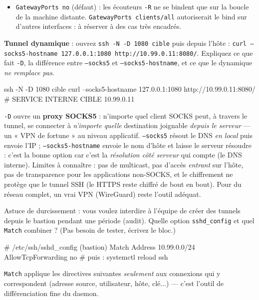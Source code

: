 \documentclass[a4paper,10pt]{exam}
\begin{document}
\begin{questions}
\begin{solution}
\begin{itemize}
{        par le client distant} (le client local \texttt{-L} est quand même possible ;
        c'est \texttt{PermitTunnel} et les règles \texttt{Match} qui affinent).
        Sur un bastion « kiosque » (accès shell only, pas de tunnel),
        \texttt{AllowTcpForwarding no} empêche d'utiliser le bastion comme relais pour
        contourner le réseau.
  \item \texttt{GatewayPorts no} (défaut) : les écouteurs \texttt{-R} ne se bindent que sur
        la boucle de la machine distante. \texttt{GatewayPorts clients/all} autoriserait
        le bind sur d'autres interfaces : à réserver à des cas très encadrés.
\end{itemize}
\end{solution}
\question \textbf{Tunnel dynamique} : ouvrez \texttt{ssh -N -D 1080 cible} puis depuis
l'hôte : \texttt{curl --socks5-hostname 127.0.0.1:1080
http://10.99.0.11:8080/}. Expliquez ce que fait \texttt{-D}, la différence entre
\texttt{--socks5} et \texttt{--socks5-hostname}, et ce que le dynamique \emph{ne remplace
pas}.
\begin{solution}
\begin{bashcode}
ssh -N -D 1080 cible
curl --socks5-hostname 127.0.0.1:1080 http://10.99.0.11:8080/
# SERVICE INTERNE CIBLE 10.99.0.11
\end{bashcode}
\texttt{-D} ouvre un \textbf{proxy SOCKS5} : n'importe quel client SOCKS peut, à travers
le tunnel, se connecter à \emph{n'importe quelle} destination joignable \emph{depuis le
serveur} — un « VPN de fortune » au niveau applicatif.
\texttt{--socks5} résout le DNS \emph{en local} puis envoie l'IP ;
\texttt{--socks5-hostname} envoie le nom d'hôte et laisse le serveur résoudre : c'est la
bonne option car c'est la \emph{résolution côté serveur} qui compte (le DNS interne).
Limites à connaître : pas de multicast, pas d'accès \emph{entrant} sur l'hôte, pas de
transparence pour les applications non-SOCKS, et le chiffrement ne protège que le tunnel
SSH (le HTTPS reste chiffré de bout en bout). Pour du réseau complet, un vrai VPN
(WireGuard) reste l'outil adéquat.
\end{solution}
\question Astuce de durcissement : vous voulez interdire à l'équipe de créer des tunnels
depuis le bastion pendant une période (audit). Quelle option \texttt{sshd\_config} et quel
\texttt{Match} combiner ? (Pas besoin de tester, écrivez le bloc.)
\begin{solution}
\begin{bashcode}
# /etc/ssh/sshd_config (bastion)
Match Address 10.99.0.0/24
    AllowTcpForwarding no
# puis :
systemctl reload ssh
\end{bashcode}
\texttt{Match} applique les directives suivantes \emph{seulement} aux connexions qui y
correspondent (adresse source, utilisateur, hôte, clé...) — c'est l'outil de
différenciation fine du daemon.
\end{solution}
\end{questions}
\end{document}
